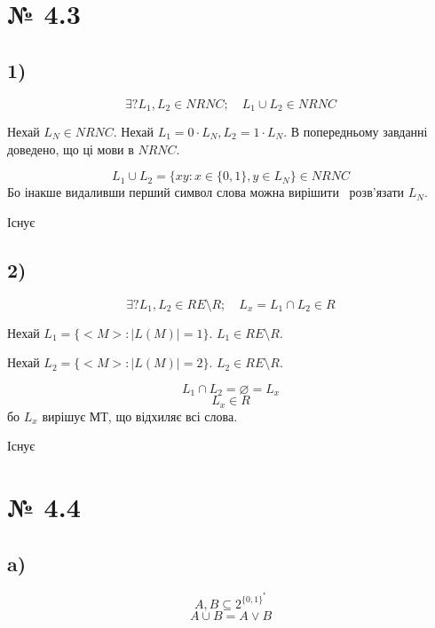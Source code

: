 \documentclass[11pt, a4paper]{article} %
\begin{document}
\section*{№ 4.3}
\subsection*{1)}
\begin{mdframed}
    $$\exists? L_1, L_2 \in NRNC;\quad L_1\cup L_2 \in NRNC$$
\end{mdframed}
Нехай $L_{N} \in NRNC$.
Нехай $L_1 = 0\cdot L_N, L_2 = 1\cdot L_N$.
В попередньому завданні доведено, що ці мови в $NRNC$.

$$L_1 \cup L_2 = \{xy : x \in \{0,1\}, y \in L_{N}\} \in NRNC$$
Бо інакше видаливши перший символ слова можна вирішити \ розв'язати $L_N$.
\begin{mdframed}[style=ans]
    Існує
\end{mdframed}

\subsection*{2)}
\begin{mdframed}
    $$\exists? L_1, L_2 \in RE \setminus R;\quad L_x = L_1\cap L_2 \in R$$
\end{mdframed}

Нехай $L_{1} = \{<M> : |L(M)| = 1\}$.
$L_{1} \in RE \setminus R$.

Нехай $L_{2} = \{<M> : |L(M)| = 2\}$.
$L_{2} \in RE \setminus R$.

$$L_1 \cap L_2 = \varnothing = L_x$$
$$L_x \in R$$
бо $L_x$ вирішує МТ, що відхиляє всі слова.
\begin{mdframed}[style=ans]
    Існує
\end{mdframed}

\section*{№ 4.4}
\subsection*{a)}
\begin{mdframed}
    $$A, B \subseteq 2^{\{0,1\}^*}$$
    $$A\cup B = A \vee B$$
\end{mdframed}
\end{document}
